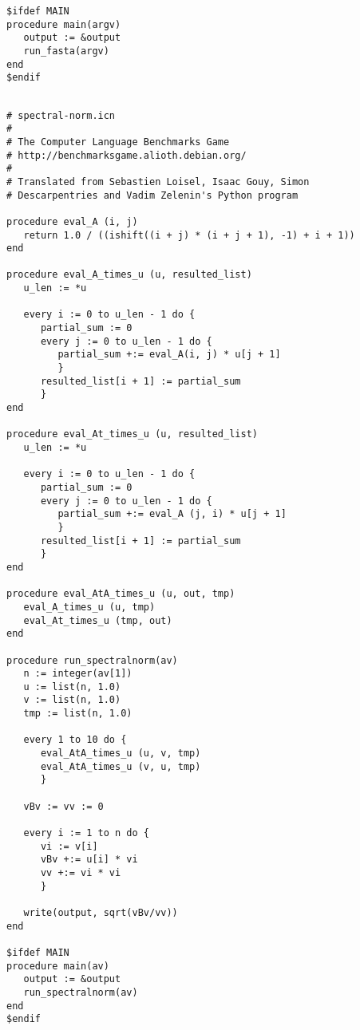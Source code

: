 \documentclass[letterpaper,12pt]{article}
\begin{document}
\begin{verbatim}
$ifdef MAIN
procedure main(argv) 
   output := &output
   run_fasta(argv) 
end
$endif

\end{verbatim}

\newpage

\begin{verbatim}

# spectral-norm.icn
#
# The Computer Language Benchmarks Game
# http://benchmarksgame.alioth.debian.org/
#
# Translated from Sebastien Loisel, Isaac Gouy, Simon
# Descarpentries and Vadim Zelenin's Python program

procedure eval_A (i, j)
   return 1.0 / ((ishift((i + j) * (i + j + 1), -1) + i + 1))
end

procedure eval_A_times_u (u, resulted_list)
   u_len := *u
   
   every i := 0 to u_len - 1 do {
      partial_sum := 0
      every j := 0 to u_len - 1 do {
         partial_sum +:= eval_A(i, j) * u[j + 1]
         } 
      resulted_list[i + 1] := partial_sum
      }
end

procedure eval_At_times_u (u, resulted_list)
   u_len := *u
   
   every i := 0 to u_len - 1 do {
      partial_sum := 0
      every j := 0 to u_len - 1 do {
         partial_sum +:= eval_A (j, i) * u[j + 1]
         }
      resulted_list[i + 1] := partial_sum
      }
end

procedure eval_AtA_times_u (u, out, tmp)
   eval_A_times_u (u, tmp)
   eval_At_times_u (tmp, out)
end

procedure run_spectralnorm(av)
   n := integer(av[1])
   u := list(n, 1.0)
   v := list(n, 1.0)
   tmp := list(n, 1.0)

   every 1 to 10 do {
      eval_AtA_times_u (u, v, tmp)
      eval_AtA_times_u (v, u, tmp)
      }

   vBv := vv := 0

   every i := 1 to n do {
      vi := v[i]
      vBv +:= u[i] * vi
      vv +:= vi * vi
      }

   write(output, sqrt(vBv/vv))
end

$ifdef MAIN
procedure main(av)
   output := &output
   run_spectralnorm(av)
end
$endif

\end{verbatim}

\newpage
\end{document}
